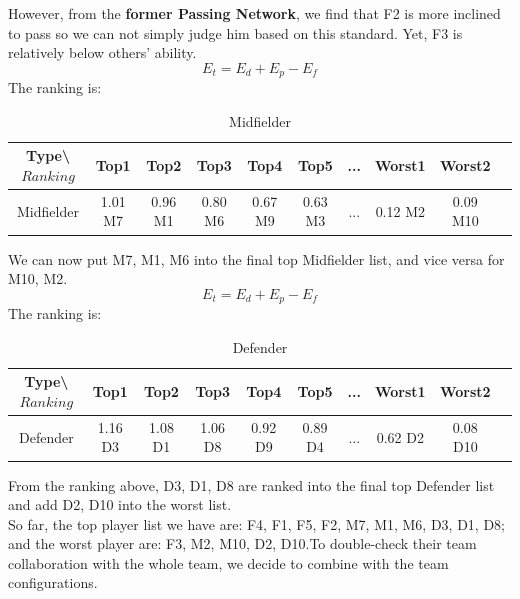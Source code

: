 \documentclass[12pt]{article}
\begin{document}
However, from the \textbf{former Passing Network}, we find that F2 is more inclined to pass so we can not simply judge him based on this standard. Yet, F3 is relatively below others’ ability.\newline 
\begin{equation*}
 E_t= E_d + E_p - E_f
\end{equation*}\newline
The ranking is:\newline
\begin{table}[ht]
\begin{center}
\begin{tabular}{|c|c|c|c|c|c|c|c|c|c|}
\hline
Type\backslash $Ranking$ & Top1 & Top2 & Top3 & Top4 & Top5 & ... & Worst1 & Worst2\\
\hline
Midfielder & 1.01 M7 & 0.96 M1 & 0.80 M6 & 0.67 M9 & 0.63 M3 &... & 0.12 M2 & 0.09 M10\\
\hline
\end{tabular}
\caption{Midfielder}
\end{center}
\end{table}
\newline
We can now put M7, M1, M6 into the final top Midfielder list, and vice versa for M10, M2. 
\newline 
\begin{equation*}
 E_t= E_d + E_p - E_f
\end{equation*}\newline
The ranking is:\newline
\begin{table}[ht]
\begin{center}
\begin{tabular}{|c|c|c|c|c|c|c|c|c|c|}
\hline
Type\backslash $Ranking$ & Top1 & Top2 & Top3 & Top4 & Top5 & ... & Worst1 & Worst2\\
\hline
Defender & 1.16 D3 & 1.08 D1 & 1.06 D8 & 0.92 D9 & 0.89 D4 &... & 0.62 D2 & 0.08 D10\\
\hline
\end{tabular}
\caption{Defender}
\end{center}
\end{table}\newline
From the ranking above, D3, D1, D8 are ranked into the final top Defender list and add D2, D10 into the worst list. \\
\newline
So far, the top player list we have are: F4, F1, F5,  F2, M7, M1, M6, D3, D1, D8; and the worst player are: F3, M2, M10, D2, D10.To double-check their team collaboration with the whole team, we decide to combine with the team configurations.\\
\end{document}

